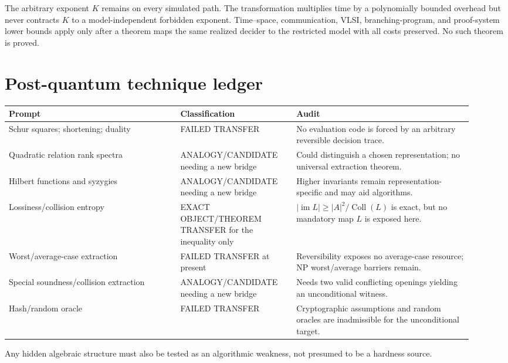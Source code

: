\documentclass[11pt]{article}
\begin{document}
The arbitrary exponent $K$ remains on every simulated path.  The
transformation multiplies time by a polynomially bounded overhead but never
contracts $K$ to a model-independent forbidden exponent.  Time--space,
communication, VLSI, branching-program, and proof-system lower bounds apply
only after a theorem maps the same realized decider to the restricted model
with all costs preserved.  No such theorem is proved.

\section{Post-quantum technique ledger}
\begin{center}\small
\begin{tabular}{@{}p{0.34\linewidth}p{0.23\linewidth}p{0.35\linewidth}@{}}
\toprule
Prompt & Classification & Audit\\ \midrule
Schur squares; shortening; duality & FAILED TRANSFER & No evaluation code is forced by an arbitrary reversible decision trace.\\
Quadratic relation rank spectra & ANALOGY/CANDIDATE needing a new bridge & Could distinguish a chosen representation; no universal extraction theorem.\\
Hilbert functions and syzygies & ANALOGY/CANDIDATE needing a new bridge & Higher invariants remain representation-specific and may aid algorithms.\\
Lossiness/collision entropy & EXACT OBJECT/THEOREM TRANSFER for the inequality only & $|\operatorname{im}L|\ge |A|^2/\operatorname{Coll}(L)$ is exact, but no mandatory map $L$ is exposed here.\\
Worst/average-case extraction & FAILED TRANSFER at present & Reversibility exposes no average-case resource; NP worst/average barriers remain.\\
Special soundness/collision extraction & ANALOGY/CANDIDATE needing a new bridge & Needs two valid conflicting openings yielding an unconditional witness.\\
Hash/random oracle & FAILED TRANSFER & Cryptographic assumptions and random oracles are inadmissible for the unconditional target.\\
\bottomrule
\end{tabular}
\end{center}
Any hidden algebraic structure must also be tested as an algorithmic weakness,
not presumed to be a hardness source.
\end{document}
